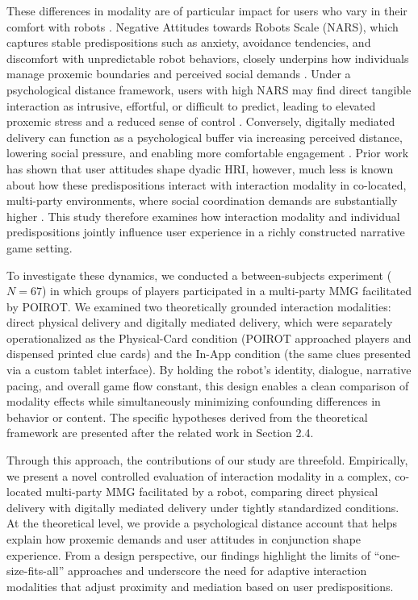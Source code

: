 \documentclass[sigconf,screen]{acmart-tagged}
\begin{document}
These differences in modality are of particular impact for users who vary in their comfort with robots \cite{kabacinska2025influence, herzog2025influence, li2019comparing}. Negative Attitudes towards Robots Scale (NARS), which captures stable predispositions such as anxiety, avoidance tendencies, and discomfort with unpredictable robot behaviors, closely underpins how individuals manage proxemic boundaries and perceived social demands \cite{nomura2006measurement, nomura2007experimental, kodani2024effects, kabacinska2025influence}. Under a psychological distance framework, users with high NARS may find direct tangible interaction as intrusive, effortful, or difficult to predict, leading to elevated proxemic stress and a reduced sense of control \cite{liberman2007psychological, trope2007construal, herzog2025influence, miller2021more, nomura2007experimental}. Conversely, digitally mediated delivery can function as a psychological buffer via increasing perceived distance, lowering social pressure, and enabling more comfortable engagement \cite{shahid2024effectiveness, osler2023sociality, warnock2020treating}. Prior work has shown that user attitudes shape dyadic HRI, however, much less is known about how these predispositions interact with interaction modality in co-located, multi-party environments, where social coordination demands are substantially higher \cite{kabacinska2025influence, nigro2025social, dahiya2023survey, schneiders2022non}. This study therefore examines how interaction modality and individual predispositions jointly influence user experience in a richly constructed narrative game setting.

To investigate these dynamics, we conducted a between-subjects experiment ($N=67$) in which groups of players participated in a multi-party MMG facilitated by POIROT. We examined two theoretically grounded interaction modalities: direct physical delivery and digitally mediated delivery, which were separately operationalized as the Physical-Card condition (POIROT approached players and dispensed printed clue cards) and the In-App condition (the same clues presented via a custom tablet interface). By holding the robot’s identity, dialogue, narrative pacing, and overall game flow constant, this design enables a clean comparison of modality effects while simultaneously minimizing confounding differences in behavior or content. The specific hypotheses derived from the theoretical framework are presented after the related work in Section 2.4.

Through this approach, the contributions of our study are threefold. Empirically, we present a novel controlled evaluation of interaction modality in a complex, co-located multi-party MMG facilitated by a robot, comparing direct physical delivery with digitally mediated delivery under tightly standardized conditions. At the theoretical level, we provide a psychological distance account that helps explain how proxemic demands and user attitudes in conjunction shape experience. From a design perspective, our findings highlight the limits of “one-size-fits-all” approaches and underscore the need for adaptive interaction modalities that adjust proximity and mediation based on user predispositions.
\end{document}
